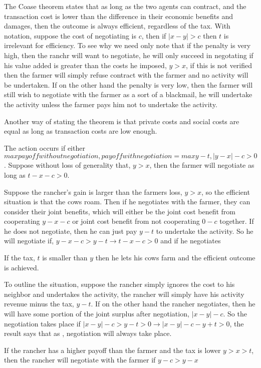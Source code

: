 \documentclass[12pt]{article}
\numberwithin{equation}{section}
\begin{document}
The Coase theorem states that as long as the two agents can contract, and the transaction cost is lower than the difference in their economic benefits and damages, then the outcome is always efficient, regardless of the tax. With notation, suppose the cost of negotiating is $c$, then if $|x-y|>c$ then $t$ is irrelevant for efficiency. To see why we need only note that if the penalty is very high, then the ranchr will want to negotiate, he will only succeed in negotating if his value added is greater than the costs he imposed, $y>x$, if this is not verified then the farmer will simply refuse contract with the farmer and no activity will be undertaken. If on the other hand the penalty is very low, then the farmer will still wish to negotiate with the farmer as a sort of a blackmail, he will undertake the activity unless the farmer pays him not to undertake the activity.

Another way of stating the theorem is that private costs and social costs are equal as long as transaction costs are low enough. 

The action occurs if either $max{payoff without negotiation, payoff with negotiation }=max{y-t,|y-x|-c}>0$. Suppose without loss of generality that, $y>x$, then the farmer will negotiate as long as $t-x-c>0$. 

 

Suppose the rancher's gain is larger than the farmers loss, $y>x$, so the efficient situation is that the cows roam. Then if he negotiates with the farmer, they can consider their joint benefits, which will either be the joint cost benefit from cooperating $y-x-c$ or joint cost benefit from not cooperating $0-c$ together. If he does not negotiate, then he can just pay $y-t$ to undertake the activity. So he will negotiate if, $y-x-c>y-t \rightarrow t-x-c>0$ and if he negotiates

If the tax, $t$ is smaller than $y$ then he lets his cows farm and the efficient outcome is achieved.   

To outline the situation, suppose the rancher simply ignores the cost to his neighbor and undertakes the activity, the rancher will simply have his activity revenue minus the tax, $y-t$. If on the other hand the rancher negotiates, then he will have some portion of the joint surplus after negotiation, $|x-y|-c$. So the negotiation takes place if $|x-y|-c>y-t>0 \rightarrow  |x-y|-c-y+t>0$, the result says that as , negotiation will always take place. 

If the rancher has a higher payoff than the farmer and the tax is lower $y>x>t$, then the rancher will negotiate with the farmer if $y-c>y-x$ 
\end{document}
